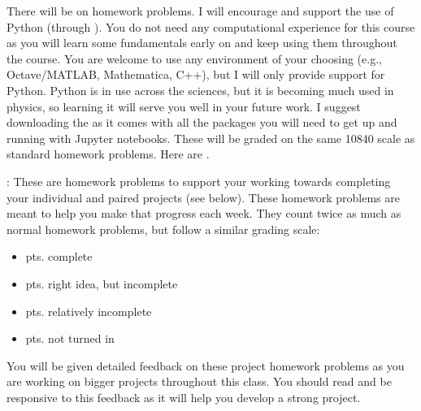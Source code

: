 \documentclass[letterpaper,10pt,english]{jupyterBook}
\begin{document}
\sphinxAtStartPar
{} There will be  on homework problems. I will encourage and support the use of Python (through ). You do not need any computational experience for this course as you will learn some fundamentals early on and keep using them throughout the course. You are welcome to use any environment of your choosing (e.g., Octave/MATLAB, Mathematica, C++), but I will only provide support for Python. Python is in use across the sciences, but it is becoming much used in physics, so learning it will serve you well in your future work. I suggest downloading the  as it comes with all the packages you will need to get up and running with Jupyter notebooks. These will be graded on the same 10\sphinxhyphen{}8\sphinxhyphen{}4\sphinxhyphen{}0 scale as standard homework problems. Here are .

\sphinxAtStartPar
{}: These are homework problems to support your working towards completing your individual and paired projects (see below).  These homework problems are meant to help you make that progress each week. They count twice as much as normal homework problems, but follow a similar grading scale:
\begin{itemize}
\item {} 
 pts. complete

\item {} 
 pts. right idea, but incomplete

\item {} 
 pts. relatively incomplete

\item {} 
 pts. not turned in

\end{itemize}

\sphinxAtStartPar
You will be given detailed feedback on these project homework problems as you are working on bigger projects throughout this class. You should read and be responsive to this feedback as it will help you develop a strong project.
\end{document}
